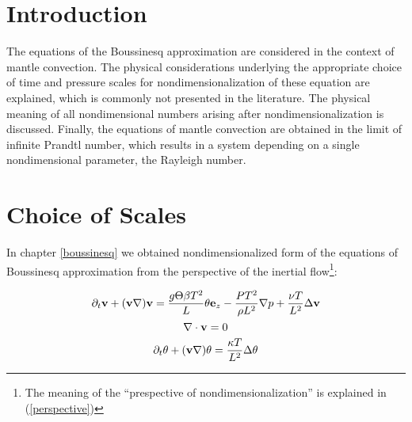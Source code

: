 \providecommand{\partialTimeTemp}{\partial_t\theta}
\providecommand{\inertTermTemp}{(\velocity\nabla)\theta}
\providecommand{\tempGrad}{\nabla \theta}
\providecommand{\laplacianTemp}{\Delta\theta}


\providecommand{\divergenceNondim}{\nabla^{\prime}\cdot}

\providecommand{\velocityNondim}{\mathbf{v^{\prime}}}

\providecommand{\substDerivVelNondim}{\frac{D\velocity^{\prime}}{dt^{\prime}}}
\providecommand{\partialTimeVelNondim}{\partial_{t^{\prime}}\velocity^{\prime}}
\providecommand{\inertTermVelNondim}{(\velocity^{\prime}\nabla^{\prime})\velocity^{\prime}}

\providecommand{\velocityPressureTensorNondim}{\partial_k^{\prime}v^{l \prime}\partial_k^{\prime}v^{l \prime}}

\providecommand{\pressGradNondim}{\nabla^{\prime} p^{\prime}}
\providecommand{\pressLaplacianNondim}{\Delta^{\prime} p^{\prime}}
\providecommand{\laplacianVelNondim}{\Delta^{\prime}\velocity^{\prime}}

\section{Introduction} 

The equations of the Boussinesq approximation are considered in the context of mantle convection. The physical considerations underlying the appropriate choice of time and pressure scales for nondimensionalization of these equation are explained, which is commonly not presented in the literature. The physical meaning of all nondimensional numbers arising after nondimensionalization is discussed. Finally, the equations of mantle convection are obtained in the limit of infinite Prandtl number, which results in a system depending on a single nondimensional parameter, the Rayleigh number. 

\section{Choice of Scales}

In chapter \ref{boussinesq} we obtained nondimensionalized form of the equations of Boussinesq approximation from the perspective of the inertial flow\footnote{The meaning of the ``prespective of nondimensionalization'' is explained in (\ref{perspective})}:

\begin{equation} \label{NS1-inertNondim_boussinesq}
\partial_t\mathbf{v} + (\mathbf{v}\nabla)\mathbf{v} = \frac{g\Theta \beta T^2}{L} \theta \mathbf{e}_z - \frac{PT^2}{\rho L^2} \nabla p + \frac{\nu T}{L^2} \Delta\mathbf{v} 
\end{equation}
\begin{equation} \label{NS2-inertNondim_boussinesq}
\nabla\cdot \mathbf{v} = 0
\end{equation}
\begin{equation} \label{heat_eq_inertNondim_boussinesq}
\partialTimeTemp + \inertTermTemp = \frac{\kappa T}{L^2} \laplacianTemp  
\end{equation} 

